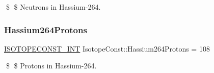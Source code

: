 \$ \$ Neutrons in Hassium-\/264. \mbox{\label{group___isotope_const-_hassium-_hs264_ga1f9dd1c7a167cf8e9c50739bee271709}} 
\subsubsection{\texorpdfstring{Hassium264\+Protons}{Hassium264Protons}}
{\footnotesize\ttfamily \mbox{\hyperlink{group___isotope_const-_macros_ga5f18360b3e99483a35c32d789e62621c}{I\+S\+O\+T\+O\+P\+E\+C\+O\+N\+S\+T\+\_\+\+I\+NT}} Isotope\+Const\+::\+Hassium264\+Protons = 108}

\$ \$ Protons in Hassium-\/264. 